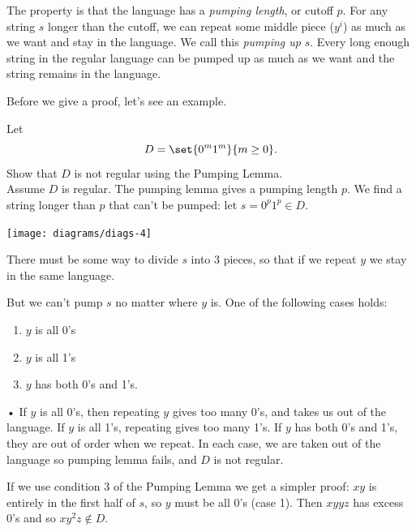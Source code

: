 The property is that the language has a {\it pumping length}, or cutoff $p$. For any string $s$ longer than the cutoff, we can repeat some middle piece ($y^i$) as much as we want and stay in the language.  We call this {\it pumping up} $s$. %
Every long enough string in the regular language can be pumped up as much as we want and the string remains in the language. 

Before we give a proof, let's see an example.
\begin{ex}
Let 
\[D=\set{0^m1^m}{m\ge 0}.\] Show that $D$ is not regular using the Pumping Lemma. \\

\vskip0.15in
Assume $D$ is regular. The pumping lemma gives a pumping length $p$. We find a string longer than $p$ that can't be pumped: let $s=0^p1^p\in D$.

\begin{center}
\texttt{[image: diagrams/diags-4]}
\end{center}

There must be some way to divide $s$ into 3 pieces, so that if we repeat $y$ we stay in the same language.

But we can't pump $s$ no matter where $y$ is. One of the following cases holds:
\begin{enumerate}
\item
$y$ is all 0's
\item
$y$ is all 1's
\item
$y$ has both 0's and 1's.
\end{enumerate}•
If $y$ is all 0's, then repeating $y$ gives too many 0's, and takes us out of the language. If $y$ is all 1's, repeating gives too many 1's. If $y$ has both 0's and 1's, they are out of order when we repeat. In each case, we are taken out of the language so pumping lemma fails, and $D$ is not regular.

If we use condition 3 of the Pumping Lemma we get a simpler proof: $xy$ is entirely in the first half of $s$, so $y$ must be all 0's (case 1). Then $xyyz$ has excess 0's and so $xy^2z\nin D$.
\end{ex}

